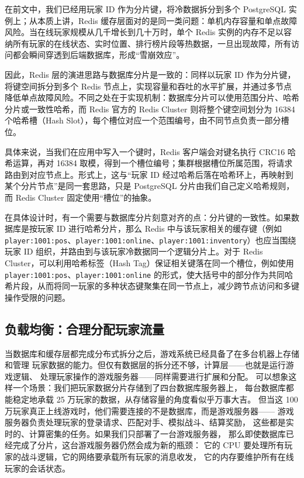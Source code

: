 在前文中，我们已经用玩家 ID 作为分片键，将冷数据拆分到多个 PostgreSQL 实例上；从本质上讲，Redis 缓存层面对的是同一类问题：单机内存容量和单点故障风险。当在线玩家规模从几千增长到几十万时，单个 Redis 实例的内存不足以容纳所有玩家的在线状态、实时位置、排行榜片段等热数据，一旦出现故障，所有访问都会瞬间穿透到后端数据库，形成“雪崩效应”。

因此，Redis 层的演进思路与数据库分片是一致的：同样以玩家 ID 作为分片键，将键空间拆分到多个 Redis 节点上，实现容量和吞吐的水平扩展，并通过多节点降低单点故障风险。不同之处在于实现机制：数据库分片可以使用范围分片、哈希分片或一致性哈希，而 Redis 官方的 Redis Cluster 则将整个键空间划分为 16384 个哈希槽（Hash Slot），每个槽位对应一个范围编号，由不同节点负责一部分槽位。

具体来说，当我们在应用中写入一个键时，Redis 客户端会对键名执行 CRC16 哈希运算，再对 16384 取模，得到一个槽位编号；集群根据槽位所属范围，将请求路由到对应节点上。形式上，这与“玩家 ID 经过哈希后落在哈希环上，再映射到某个分片节点”是同一套思路，只是 PostgreSQL 分片由我们自己定义哈希规则，而 Redis Cluster 固定使用“槽位”的抽象。

在具体设计时，有一个需要与数据库分片刻意对齐的点：分片键的一致性。如果数据库是按玩家 ID 进行哈希分片，那么 Redis 中与该玩家相关的缓存键（例如 \texttt{player:1001:pos}、\texttt{player:1001:online}、\texttt{player:1001:inventory}）也应当围绕玩家 ID 组织，并路由到与该玩家冷数据同一个逻辑分片上。对于 Redis Cluster，可以利用哈希标签（Hash Tag）保证相关键落在同一个槽位，例如使用 \texttt{{player:1001}:pos}、\texttt{{player:1001}:online} 的形式，使大括号中的部分作为共同哈希片段，从而将同一玩家的多种状态键聚集在同一节点上，减少跨节点访问和多键操作受限的问题。


\subsection{负载均衡：合理分配玩家流量}

当数据库和缓存层都完成分布式拆分之后，游戏系统已经具备了在多台机器上存储和管理
玩家数据的能力。但仅有数据层的拆分还不够，计算层——也就是运行游戏逻辑、
处理玩家操作的游戏服务器——同样需要进行扩展和分配。
可以想象这样一个场景：我们把玩家数据分片存储到了四台数据库服务器上，
每台数据库都能稳定地承载 25 万玩家的数据，从存储容量的角度看似乎万事大吉。
但当这 100 万玩家真正上线游戏时，他们需要连接的不是数据库，而是游戏服务器——
游戏服务器负责处理玩家的登录请求、匹配对手、模拟战斗、结算奖励，
这些都是实时的、计算密集的任务。如果我们只部署了一台游戏服务器，
那么即使数据库已经完成了分片，这台游戏服务器仍然会成为新的瓶颈：
它的 CPU 要处理所有玩家的战斗逻辑，它的网络要承载所有玩家的消息收发，
它的内存要维护所有在线玩家的会话状态。

